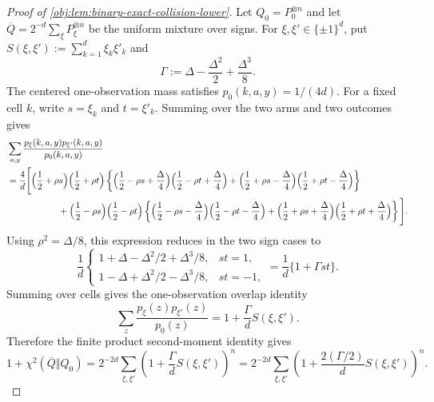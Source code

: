 \documentclass[11pt]{article}
\begin{document}
\begin{proof}[Proof of \cref{obj:lem:binary-exact-collision-lower}]
Let \(Q_0=P_0^{\otimes n}\) and let \(\overline Q=2^{-d}\sum_\xi P_\xi^{\otimes n}\) be the uniform mixture over signs.  For \(\xi,\xi'\in\{\pm1\}^d\), put \(S(\xi,\xi'):=\sum_{k=1}^d \xi_k\xi'_k\) and
\[
\Gamma:=\Delta-\frac{\Delta^2}{2}+\frac{\Delta^3}{8}.
\]
The centered one-observation mass satisfies \(p_0(k,a,y)=1/(4d)\).  For a fixed cell \(k\), write \(s=\xi_k\) and \(t=\xi'_k\).  Summing over the two arms and two outcomes gives
\[
\begin{aligned}
&\sum_{a,y}\frac{p_\xi(k,a,y)p_{\xi'}(k,a,y)}{p_0(k,a,y)} \\
&=\frac4d\Bigg[
\Big(\frac12+\rho s\Big)\Big(\frac12+\rho t\Big)
\left\{
\Big(\frac12-\rho s+\frac\Delta4\Big)
\Big(\frac12-\rho t+\frac\Delta4\Big)
+
\Big(\frac12+\rho s-\frac\Delta4\Big)
\Big(\frac12+\rho t-\frac\Delta4\Big)
\right\} \\
&\hspace{2.0cm}+
\Big(\frac12-\rho s\Big)\Big(\frac12-\rho t\Big)
\left\{
\Big(\frac12-\rho s-\frac\Delta4\Big)
\Big(\frac12-\rho t-\frac\Delta4\Big)
+
\Big(\frac12+\rho s+\frac\Delta4\Big)
\Big(\frac12+\rho t+\frac\Delta4\Big)
\right\}\Bigg].
\end{aligned}
\]
Using \(\rho^2=\Delta/8\), this expression reduces in the two sign cases to
\[
\frac1d
\begin{cases}
1+\Delta-\Delta^2/2+\Delta^3/8, & st=1,\\
1-\Delta+\Delta^2/2-\Delta^3/8, & st=-1,
\end{cases}
=\frac1d\{1+\Gamma st\}.
\]
Summing over cells gives the one-observation overlap identity
\[
\sum_z\frac{p_\xi(z)p_{\xi'}(z)}{p_0(z)}
=
1+\frac{\Gamma}{d}S(\xi,\xi').
\]
Therefore the finite product second-moment identity gives
\[
1+\chi^2(\overline Q\Vert Q_0)
=
2^{-2d}\sum_{\xi,\xi'}
\left(1+\frac{\Gamma}{d}S(\xi,\xi')\right)^n
=
2^{-2d}\sum_{\xi,\xi'}
\left(1+\frac{2(\Gamma/2)}{d}S(\xi,\xi')\right)^n .
\] %


\end{proof}
\end{document}
